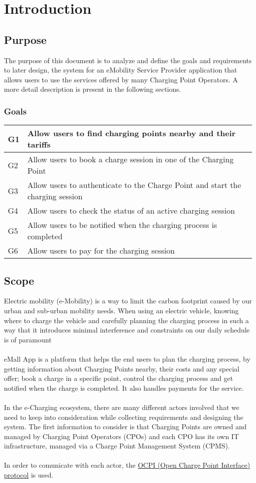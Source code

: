 \chapter{Introduction}
\section{Purpose}
The purpose of this document is to analyze and define the goals and requirements to later design, the system for an eMobility Service Provider application that allows users to use the services offered by many Charging Point Operators. A more detail description is present in the following sections.
\subsection{Goals}
\begin{tabular}{ |l|l| } 
 \hline
G1 & Allow users to find charging points nearby and their tariffs\\
 \hline
G2 & Allow users to book a charge session in one of the Charging Point\\
 \hline
G3 & Allow users to authenticate to the Charge Point and start the charging session\\
 \hline
G4 & Allow users to check the status of an active charging session\\
 \hline
G5 & Allow users to be notified when the charging process is completed\\
 \hline
G6 & Allow users to pay for the charging session\\
 \hline
\end{tabular}

\section{Scope}
Electric mobility (e-Mobility) is a way to limit the carbon footprint caused by our urban and sub-urban mobility needs. When using an electric vehicle, knowing where to charge the vehicle and carefully planning the charging process in such a way that it introduces minimal interference and constraints on our daily schedule is of paramount \\\\
eMall App is a platform that helps the end users to plan the charging process, by getting information about Charging Points nearby, their costs and any special offer; book a charge in a specific point, control the charging process and get notified when the charge is completed. It also handles payments for the service.\\\\
In the e-Charging ecosystem, there are many different actors involved that we need to keep into consideration while collecting requirements and designing the system. The first information to consider is that Charging Points are owned and managed by Charging Point Operators (CPOs) and each CPO has its own IT infrastructure, managed via a Charge Point Management System (CPMS). \\\\
In order to comunicate with each actor, the 
\href{../Specs/OCPI-2.2.1.pdf}{OCPI (Open Charge Point Interface) protocol} is used.

